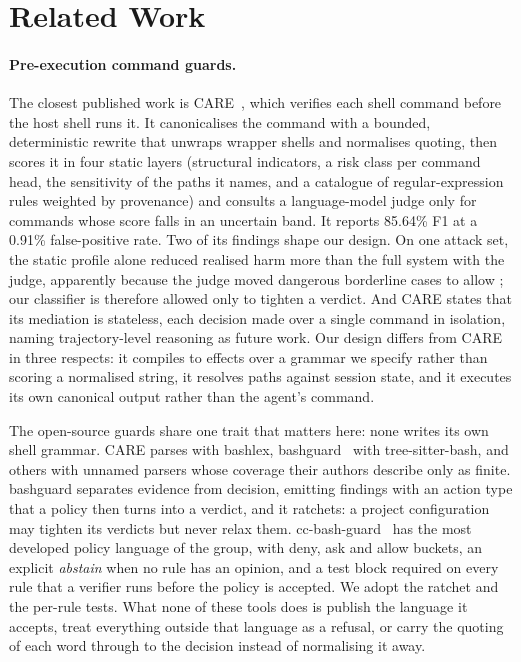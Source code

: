 \section{Related Work}\label{sec:related}

\paragraph{Pre-execution command guards.}
The closest published work is CARE~\cite{care}, which verifies each shell command before the
host shell runs it. It canonicalises the command with a bounded, deterministic rewrite that
unwraps wrapper shells and normalises quoting, then scores it in four static layers (structural
indicators, a risk class per command head, the sensitivity of the paths it names, and a catalogue
of regular-expression rules weighted by provenance) and consults a language-model judge only for
commands whose score falls in an uncertain band. It reports 85.64\% F1 at a 0.91\%
false-positive rate. Two of its findings shape our design. On one
attack set, the static profile alone reduced realised harm more than the full system with the
judge, apparently because the judge moved dangerous borderline cases to allow%
; our classifier is therefore allowed only to tighten a
verdict. And CARE states that its mediation is stateless, each decision made over a single
command in isolation, naming trajectory-level reasoning as future work. Our design differs from
CARE in three respects: it compiles to effects over a grammar we specify rather than scoring a
normalised string, it resolves paths against session state, and it executes its own canonical
output rather than the agent's command.

The open-source guards share one trait that matters here: none writes its own shell grammar.
CARE parses with bashlex, bashguard~\cite{bashguard} with tree-sitter-bash, and others with
unnamed parsers whose coverage their authors describe only as finite. bashguard separates
evidence from decision, emitting findings with an action type that a policy then turns into a
verdict, and it ratchets: a project configuration may tighten its verdicts but never relax them.
cc-bash-guard~\cite{cc-bash-guard} has the most developed policy language of the group, with
deny, ask and allow buckets, an explicit \emph{abstain} when no rule has an opinion, and a test
block required on every rule that a verifier runs before the policy is accepted. We adopt the
ratchet and the per-rule tests. What none of these tools does is publish the language it
accepts, treat everything outside that language as a refusal, or carry the quoting of each word
through to the decision instead of normalising it away.

